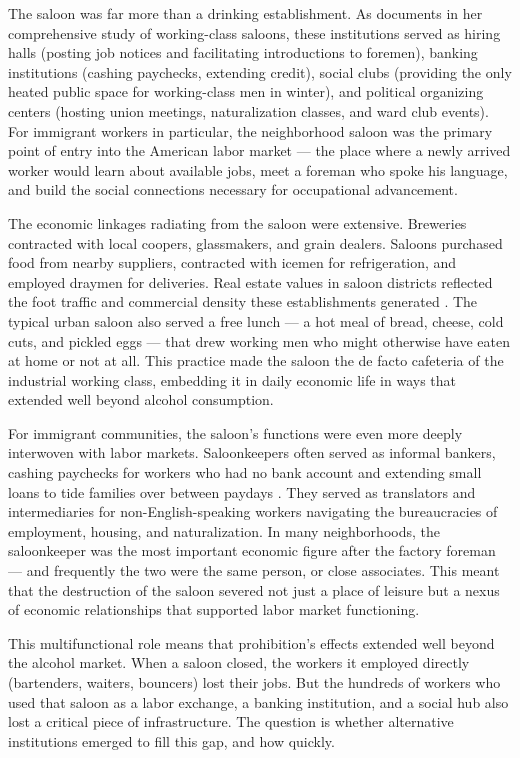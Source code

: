 \documentclass[12pt]{article}
\begin{document}
The saloon was far more than a drinking establishment. As \citet{powers1998} documents in her comprehensive study of working-class saloons, these institutions served as hiring halls (posting job notices and facilitating introductions to foremen), banking institutions (cashing paychecks, extending credit), social clubs (providing the only heated public space for working-class men in winter), and political organizing centers (hosting union meetings, naturalization classes, and ward club events). For immigrant workers in particular, the neighborhood saloon was the primary point of entry into the American labor market --- the place where a newly arrived worker would learn about available jobs, meet a foreman who spoke his language, and build the social connections necessary for occupational advancement.

The economic linkages radiating from the saloon were extensive. Breweries contracted with local coopers, glassmakers, and grain dealers. Saloons purchased food from nearby suppliers, contracted with icemen for refrigeration, and employed draymen for deliveries. Real estate values in saloon districts reflected the foot traffic and commercial density these establishments generated \citep{okrent2010}. The typical urban saloon also served a free lunch --- a hot meal of bread, cheese, cold cuts, and pickled eggs --- that drew working men who might otherwise have eaten at home or not at all. This practice made the saloon the de facto cafeteria of the industrial working class, embedding it in daily economic life in ways that extended well beyond alcohol consumption.

For immigrant communities, the saloon's functions were even more deeply interwoven with labor markets. Saloonkeepers often served as informal bankers, cashing paychecks for workers who had no bank account and extending small loans to tide families over between paydays \citep{powers1998}. They served as translators and intermediaries for non-English-speaking workers navigating the bureaucracies of employment, housing, and naturalization. In many neighborhoods, the saloonkeeper was the most important economic figure after the factory foreman --- and frequently the two were the same person, or close associates. This meant that the destruction of the saloon severed not just a place of leisure but a nexus of economic relationships that supported labor market functioning.

This multifunctional role means that prohibition's effects extended well beyond the alcohol market. When a saloon closed, the workers it employed directly (bartenders, waiters, bouncers) lost their jobs. But the hundreds of workers who used that saloon as a labor exchange, a banking institution, and a social hub also lost a critical piece of infrastructure. The question is whether alternative institutions emerged to fill this gap, and how quickly.
\end{document}
